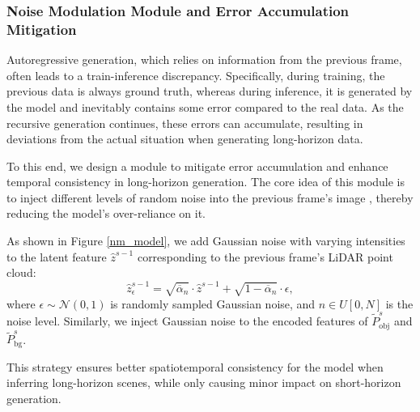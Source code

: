 \subsubsection{Noise Modulation Module and Error Accumulation Mitigation}
Autoregressive generation, which relies on information
from the previous frame, often leads to a train-inference discrepancy. 
Specifically, during training, the previous data is always ground truth, whereas during inference, it is generated by the model and inevitably contains some error compared to the real data. 
As the recursive generation continues, these errors can accumulate, resulting in deviations from the actual situation when generating long-horizon data.

To this end, we design a module to mitigate error accumulation and enhance temporal consistency in long-horizon generation. 
The core idea of this module is to inject different levels of random noise into the previous frame’s image \cite{chen2024diffusion, deng2024streetscapes}, thereby reducing the model’s over-reliance on it.

As shown in Figure \ref{nm_model}, we add Gaussian noise with varying intensities to the latent feature \( \hat{z}^{s-1} \) corresponding to the previous frame’s LiDAR point cloud:
\begin{equation}
\label{diffusion_forcing}
\hat{z}_{\epsilon}^{s-1} =\sqrt{\overline{\alpha}_{n}} \cdot  \hat{z}^{s-1} +\sqrt{1-\overline{\alpha}_{n}} \cdot \epsilon,
\end{equation}
where \( \epsilon \sim \mathcal{N}(0, 1) \) is randomly sampled Gaussian noise, and \( n \in U[0, N] \) is the noise level.
Similarly, we inject Gaussian noise to the encoded features of \( \widetilde{P}^{s}_{\text{obj}} \) and \( \widetilde{P}^{s}_{\text{bg}} \).

This strategy ensures better spatiotemporal consistency for the model when inferring long-horizon scenes, while only causing minor impact on short-horizon generation.

